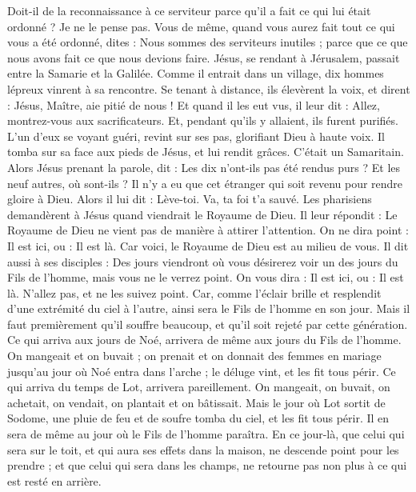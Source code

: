 \begin{multicols}{2}
{Doit-il de la reconnaissance à ce serviteur parce qu’il a fait ce qui lui était ordonné ? Je ne le pense pas.
Vous de même, quand vous aurez fait tout ce qui vous a été ordonné, dites : Nous sommes des serviteurs inutiles ; parce que ce que nous avons fait ce que nous devions faire.
Jésus, se rendant à Jérusalem, passait entre la Samarie et la Galilée.
Comme il entrait dans un village, dix hommes lépreux vinrent à sa rencontre. Se tenant à distance, ils élevèrent la voix, et dirent :
Jésus, Maître, aie pitié de nous !
Et quand il les eut vus, il leur dit : Allez, montrez-vous aux sacrificateurs. Et, pendant qu’ils y allaient, ils furent purifiés.
L’un d'eux se voyant guéri, revint sur ses pas, glorifiant Dieu à haute voix.
Il tomba sur sa face aux pieds de Jésus, et lui rendit grâces. C’était un Samaritain.
Alors Jésus prenant la parole, dit : Les dix n'ont-ils pas été rendus purs ? Et les neuf autres, où sont-ils ?
Il n'y a eu que cet étranger qui soit revenu pour rendre gloire à Dieu.
Alors il lui dit : Lève-toi. Va, ta foi t'a sauvé.
Les pharisiens demandèrent à Jésus quand viendrait le Royaume de Dieu. Il leur répondit : Le Royaume de Dieu ne vient pas de manière à attirer l’attention.
On ne dira point : Il est ici, ou : Il est là. Car voici, le Royaume de Dieu est au milieu de vous.
Il dit aussi à ses disciples : Des jours viendront où vous désirerez voir un des jours du Fils de l'homme, mais vous ne le verrez point. On vous dira :
Il est ici, ou : Il est là. N’allez pas, et ne les suivez point.
Car, comme l'éclair brille et resplendit d’une extrémité du ciel à l’autre, ainsi sera le Fils de l’homme en son jour.
Mais il faut premièrement qu'il souffre beaucoup, et qu'il soit rejeté par cette génération.
Ce qui arriva aux jours de Noé, arrivera de même aux jours du Fils de l'homme.
On mangeait et on buvait ; on prenait et on donnait des femmes en mariage jusqu'au jour où Noé entra dans l'arche ; le déluge vint, et les fit tous périr.
Ce qui arriva du temps de Lot, arrivera pareillement. On mangeait, on buvait, on achetait, on vendait, on plantait et on bâtissait.
Mais le jour où Lot sortit de Sodome, une pluie de feu et de soufre tomba du ciel, et les fit tous périr.
Il en sera de même au jour où le Fils de l'homme paraîtra.
En ce jour-là, que celui qui sera sur le toit, et qui aura ses effets dans la maison, ne descende point pour les prendre ; et que celui qui sera dans les champs, ne retourne pas non plus à ce qui est resté en arrière.
}
\end{multicols}
